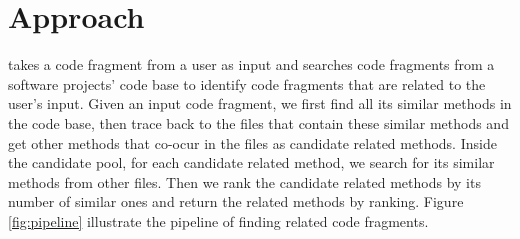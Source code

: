 \section{Approach}
\label{sec:approach}
\tool takes a code fragment from a user as input and searches code fragments from a software projects' code base to identify code fragments that are related to the user's input. Given an input code fragment, we first find all its similar methods in the code base, then trace back to the files that contain these similar methods and get other methods that co-ocur in the files as candidate related methods. Inside the candidate pool, for each candidate related method, we search for its similar methods from other files. Then we rank the candidate related methods by its number of similar ones and return the related methods by ranking. Figure \ref{fig:pipeline} illustrate the pipeline of finding related code fragments. 


